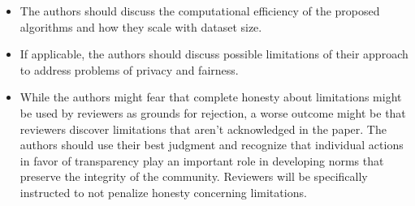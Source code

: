 \documentclass{article}
\theoremstyle{definition}
\theoremstyle{remark}
\theoremstyle{remark}
\begin{document}
\begin{enumerate}
\begin{itemize}
        \item The authors should discuss the computational efficiency of the proposed algorithms and how they scale with dataset size.
        \item If applicable, the authors should discuss possible limitations of their approach to address problems of privacy and fairness.
        \item While the authors might fear that complete honesty about limitations might be used by reviewers as grounds for rejection, a worse outcome might be that reviewers discover limitations that aren't acknowledged in the paper. The authors should use their best judgment and recognize that individual actions in favor of transparency play an important role in developing norms that preserve the integrity of the community. Reviewers will be specifically instructed to not penalize honesty concerning limitations.
    \end{itemize}


\end{enumerate}
\end{document}

